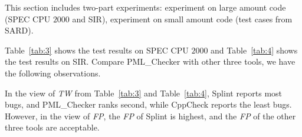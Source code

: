 This section includes two-part experiments: experiment on large amount code (SPEC CPU $2000$ and SIR), experiment on small amount code (test cases from SARD).

Table~\ref{tab:3} shows the test results on SPEC CPU $2000$ and Table~\ref{tab:4} shows the test results on SIR. Compare PML\_Checker with other three tools, we have the following observations. 

In the view of \textit{TW} from Table~\ref{tab:3} and Table~\ref{tab:4}, Splint reports most bugs, and PML\_Checker ranks second, while CppCheck reports the least bugs. However, in the view of \textit{FP}, the \textit{FP} of Splint is highest, and the \textit{FP} of the other three tools are acceptable.




